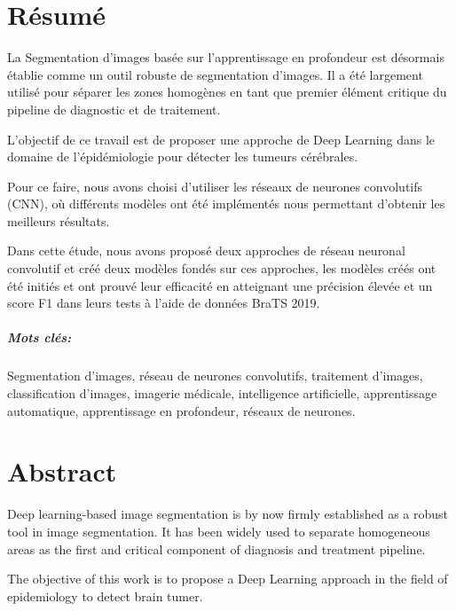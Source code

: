 \chapter*{Résumé}
\lhead{}

La Segmentation d'images basée sur l'apprentissage en profondeur est désormais établie comme un outil robuste de segmentation d'images. Il a été largement utilisé pour séparer les zones homogènes en tant que premier élément critique du pipeline de diagnostic et de traitement.\newline

L'objectif de ce travail est de proposer une approche de Deep Learning dans le domaine de l'épidémiologie pour détecter les tumeurs cérébrales.\newline

Pour ce faire, nous avons choisi d'utiliser les réseaux de neurones convolutifs (CNN), où différents modèles ont été implémentés nous permettant d'obtenir les meilleurs résultats.\newline

Dans cette étude, nous avons proposé deux approches de réseau neuronal convolutif et créé deux modèles fondés sur ces approches, les modèles créés ont été initiés et ont prouvé leur efficacité en atteignant une précision élevée et un score F1 dans leurs tests à l'aide de données BraTS 2019.

\paragraph{Mots clés:}
Segmentation d'images, réseau de neurones convolutifs, traitement d'images, classification d'images, imagerie médicale, intelligence artificielle, apprentissage automatique, apprentissage en profondeur, réseaux de neurones.

\newpage
\chapter*{Abstract}
\lhead{}

Deep learning-based image segmentation is by now firmly established as a robust tool in image segmentation. It has been widely used to separate homogeneous areas as the first and critical component of diagnosis and treatment pipeline.\newline

The objective of this work is to propose a Deep Learning approach in the field of epidemiology to detect brain tumer.\newline

